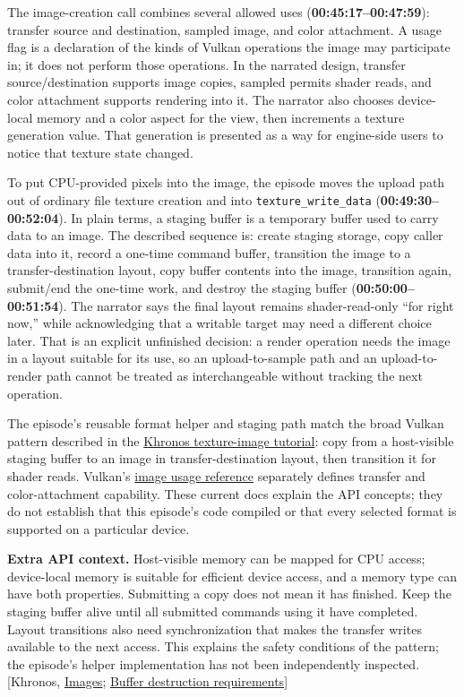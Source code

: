 The image-creation call combines several allowed uses (\textbf{00:45:17--00:47:59}): transfer source and destination, sampled image, and color attachment. A usage flag is a declaration of the kinds of Vulkan operations the image may participate in; it does not perform those operations. In the narrated design, transfer source/destination supports image copies, sampled permits shader reads, and color attachment supports rendering into it. The narrator also chooses device-local memory and a color aspect for the view, then increments a texture generation value. That generation is presented as a way for engine-side users to notice that texture state changed.

To put CPU-provided pixels into the image, the episode moves the upload path out of ordinary file texture creation and into \texttt{texture\_write\_data} (\textbf{00:49:30--00:52:04}). In plain terms, a staging buffer is a temporary buffer used to carry data to an image. The described sequence is: create staging storage, copy caller data into it, record a one-time command buffer, transition the image to a transfer-destination layout, copy buffer contents into the image, transition again, submit/end the one-time work, and destroy the staging buffer (\textbf{00:50:00--00:51:54}). The narrator says the final layout remains shader-read-only ``for right now,'' while acknowledging that a writable target may need a different choice later. That is an explicit unfinished decision: a render operation needs the image in a layout suitable for its use, so an upload-to-sample path and an upload-to-render path cannot be treated as interchangeable without tracking the next operation.

The episode's reusable format helper and staging path match the broad Vulkan pattern described in the \href{https://docs.vulkan.org/tutorial/latest/06_Texture_mapping/00_Images.html}{Khronos texture-image tutorial}: copy from a host-visible staging buffer to an image in transfer-destination layout, then transition it for shader reads. Vulkan's \href{https://docs.vulkan.org/refpages/latest/refpages/source/VkImageUsageFlagBits.html}{image usage reference} separately defines transfer and color-attachment capability. These current docs explain the API concepts; they do not establish that this episode's code compiled or that every selected format is supported on a particular device.

\textbf{Extra API context.} Host-visible memory can be mapped for CPU access; device-local memory is suitable for efficient device access, and a memory type can have both properties. Submitting a copy does not mean it has finished. Keep the staging buffer alive until all submitted commands using it have completed. Layout transitions also need synchronization that makes the transfer writes available to the next access. This explains the safety conditions of the pattern; the episode's helper implementation has not been independently inspected. {[}Khronos, \href{https://docs.vulkan.org/tutorial/latest/06_Texture_mapping/00_Images.html}{Images}; \href{https://docs.vulkan.org/refpages/latest/refpages/source/vkDestroyBuffer.html}{Buffer destruction requirements}{]}

